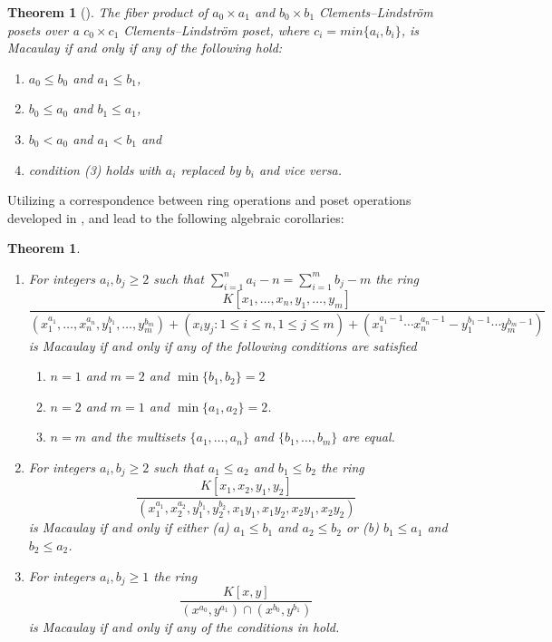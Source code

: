 \documentclass[11pt, reqno]{amsart}
\theoremstyle{plain} %
\newtheorem{introthm}[introprop]{Theorem}
\theoremstyle{definition}
\theoremstyle{remark}
\numberwithin{equation}{section}  %
\begin{document}
\begin{introthm}[]\label{introthm C}
The fiber product of $a_0\times a_1$ and $b_0\times b_1$ Clements--Lindstr\"om posets over a $c_0\times c_1$ Clements--Lindstr\"om poset, where $c_i = min\{a_i,b_i\}$, is Macaulay if and only if any of the following hold:
 \begin{enumerate} 
 \item $a_0\leq b_0$ and $a_1\leq b_1$, 
 \item $b_0\leq a_0$ and $b_1\leq a_1$,
   \item $b_0<a_0$ and $a_1<b_1$ and
   
    \item condition (3) holds with $a_i$ replaced by $b_i$ and vice versa.
\end{enumerate}
\end{introthm}

Utilizing a correspondence between ring operations and poset operations developed in ,  and  lead to the following algebraic corollaries:

\begin{introthm}\label{introthm D}
\begin{enumerate}
    \item For integers $a_i,b_j\geq 2$ such that $\sum_{i=1}^n a_i-n=\sum_{i=1}^m b_j-m$ the ring  
     {\small
     \[
    \frac{K[x_1,\ldots, x_n,y_1,\ldots, y_m]}{(x_1^{a_1},\ldots, x_n^{a_n}, y_1^{b_1},\ldots, y_m^{b_m})+( x_iy_j:1\leq i\leq n, 1\leq j\leq m)+(x_1^{a_1-1}\cdots x_n^{a_n-1}-y_1^{b_1-1}\cdots y_m^{b_m-1})}
    \]
    }
is Macaulay if and only if any of the following conditions are satisfied
\begin{enumerate}
\item $n=1$ and $m=2$ and $\min\{b_1,b_2\}=2$  
\item $n=2$ and $m=1$ and $\min\{a_1,a_2\}=2$.
\item $n=m$ and the multisets $\{a_1, \ldots, a_n\}$ and $\{b_1, \ldots, b_m\}$ are equal.
\end{enumerate}
    \item For integers $a_i,b_j\geq 2$ such that $a_1\leq a_2$ and $b_1\leq  b_2$ the ring
    \[
     \frac{K[x_1,x_2,y_1,y_2]}{(x_1^{a_1}, x_2^{a_2}, y_1^{b_1},y_2^{b_2}, x_1y_1,x_1y_2, x_2y_1, x_2y_2)}
    \]
    is Macaulay if and only if either (a) $a_1\leq b_1$ and $a_2\leq b_2$ or (b) $b_1\leq a_1$ and $b_2\leq a_2$.
    \item For integers $a_i,b_j\geq 1$ the ring
    \[
     \frac{K[x,y]}{(x^{a_0}, y^{a_1})\cap(x^{b_0},y^{b_1})}
    \]
    is Macaulay if and only if any of the conditions in  hold.
\end{enumerate}
\end{introthm}
\end{document}

